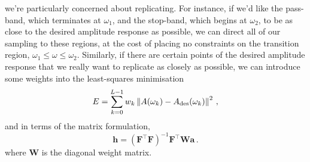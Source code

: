we're particularly concerned about replicating. For instance, if we'd like
the pass-band, which terminates at $\omega_1$, and the stop-band, which
begins at $\omega_2$, to be as close to the desired amplitude response as
possible, we can direct all of our sampling to these regions, at the cost
of placing no constraints on the transition region,
$\omega_1\leq \omega \leq\omega_2$. Similarly, if there are certain
points of the desired amplitude response that we really want to replicate
as closely as possible, we can introduce some weights into the least-squares
minimisation
%
\begin{displaymath}
  E = \sum_{k=0}^{L-1}w_k\left\lVert A(\omega_k) - A_\mathrm{des}(\omega_k)\right\rVert^2 \,,
\end{displaymath}
%
and in terms of the matrix formulation,
%
\begin{displaymath}
  \mathbf{h} = \left(\mathbf{F}^\top\mathbf{F}\right)^{-1}
  \mathbf{F}^\top\mathbf{W}\mathbf{a} \,.
\end{displaymath}
%
where $\mathbf{W}$ is the diagonal weight matrix.

